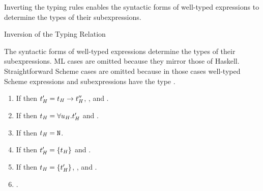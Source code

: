 Inverting the typing rules enables the syntactic forms of well-typed expressions to determine the types of their subexpressions.

\begin{lemma}{Inversion of the Typing Relation}

\label{leminv}

The syntactic forms of well-typed expressions determine the types of their subexpressions.  ML cases are omitted because they mirror those of Haskell.  Straightforward Scheme cases are omitted because in those cases well-typed Scheme expressions and subexpressions have the type \tytst.

\begin{enumerate}



\item If \judeh{\env}{\expfabss{\varvarh}{\first{\vartyh}}{\varexph}}{\second{\vartyh}} then $t_{\mathit{H}}' = t_{\mathit{H}} \rightarrow t_{\mathit{H}}''$, \judth{\env}{\first{\vartyh}}, and \judeh{\envexte{\varvarh}{\first{\vartyh}}}{\varexph}{\third{\vartyh}}.


\item If \judeh{\env}{\exptabs{\tyvarh}{\varexph}}{\first{\vartyh}} then $t_{\mathit{H}} = \forall u_{\mathit{H}} . t_{\mathit{H}}'$ and \judeh{\envextt{\tyvarh}}{\varexph}{\second{\vartyh}}.


\item If \judeh{}{\expnum{\symnum}}{\vartyh} then $t_{\mathit{H}} = \mathtt{N}$.


\item If \judeh{\env}{\expnils{\first{\vartyh}}}{\second{\vartyh}} then $t_{\mathit{H}}' = \lbrace t_{\mathit{H}} \rbrace$ and \judth{\env}{\first{\vartyh}}.


\item If \judeh{\env}{\expcons{\first{\varexph}}{\second{\varexph}}}{\first{\vartyh}} then $t_{\mathit{H}} = \lbrace t_{\mathit{H}}' \rbrace$, \judeh{\env}{\first{\varexph}}{\second{\vartyh}}, and \judeh{\env}{\second{\varexph}}{\tylist{\second{\vartyh}}}.


\item \judeh{\envexte{\varvarh}{\vartyh}}{\varvarh}{\vartyh}.


\end{enumerate}
\end{lemma}
